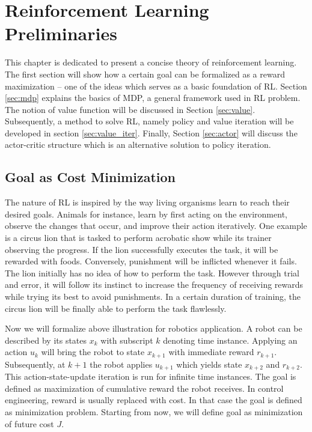 \chapter{Reinforcement Learning Preliminaries}
This chapter is dedicated to present a concise theory of reinforcement learning. The first section will show how a certain goal can be formalized as a reward maximization -- one of the ideas which serves as a basic foundation of \ac{RL}. Section \ref{sec:mdp} explains the basics of \ac{MDP}, a general framework used in \ac{RL} problem. The notion of value function will be discussed in Section \ref{sec:value}. Subsequently, a method to solve \ac{RL}, namely policy and value iteration will be developed in section \ref{sec:value_iter}. Finally, Section \ref{sec:actor} will discuss the actor-critic structure which is an alternative solution to policy iteration.

\section{Goal as Cost Minimization}
The nature of \ac{RL} is inspired by the way living organisms learn to reach their desired goals. Animals for instance, learn by first acting on the environment, observe the changes that occur, and improve their action iteratively. One example is a circus lion that is tasked to perform acrobatic show while its trainer observing the progress. If the lion successfully executes the task, it will be rewarded with foods. Conversely, punishment will be inflicted whenever it fails. The lion initially has no idea of how to perform the task. However through trial and error, it will follow its instinct to increase the frequency of receiving rewards while trying its best to avoid punishments. In a certain duration of training, the circus lion will be finally able to perform the task flawlessly. 

Now we will formalize above illustration for robotics application. A robot can be described by its states $x_k$ with subscript $k$ denoting time instance. Applying an action $u_k$ will bring the robot to state $x_{k+1}$ with immediate reward $r_{k+1}$. Subsequently, at $k+1$ the robot applies $u_{k+1}$ which yields state $x_{k+2}$ and $r_{k+2}$. This action-state-update iteration is run for infinite time instances. The goal is defined as maximization of cumulative reward the robot receives. In control engineering, reward is usually replaced with cost. In that case the goal is defined as minimization problem. Starting from now, we will define goal as minimization of future cost $J$.

